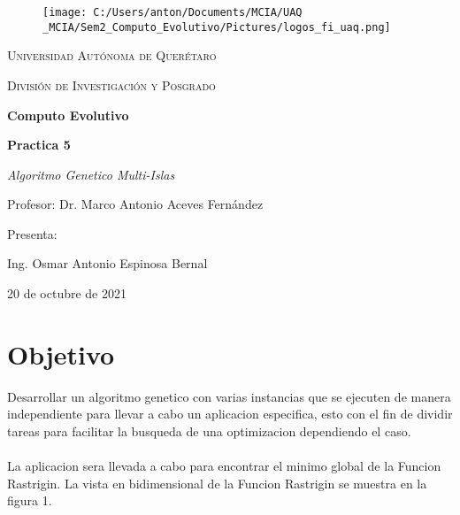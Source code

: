 \documentclass[10pt,letterpaper]{article}
\begin{document}
    \begin{titlepage}
     \centering
	   \begin{figure}
            \begin{minipage}{1\linewidth}
            \centering\centering%
            \texttt{[image: C:/Users/anton/Documents/MCIA/UAQ \_MCIA/Sem2\_Computo\_Evolutivo/Pictures/logos\_fi\_uaq.png]}
            \end{minipage}
        \end{figure}
        
        {\scshape\LARGE Universidad Autónoma de Querétaro \par}
	        \vspace{1cm}
	        
	    {\scshape\Large División de Investigación y Posgrado \par}
	        \vspace{1cm}
	        
		{\huge\bfseries Computo Evolutivo\par}
		    \vspace{1cm}
		    
		{\huge\bfseries Practica 5 \par}	
		    \vspace{1cm}
		    
		{\Large\itshape Algoritmo Genetico Multi-Islas\par}
		    \vspace{1cm}
		    
		Profesor: Dr. Marco Antonio Aceves Fernández \par
		\vspace{1.2cm}
		
		Presenta:\par  \vspace{0.15cm}
		
        Ing. Osmar Antonio Espinosa Bernal
        
		\vfill
		{\large  20 de octubre de 2021\par}
    \end{titlepage}
		\printindex
		
\section{Objetivo}
Desarrollar un algoritmo genetico con varias instancias que se ejecuten de manera independiente para llevar a cabo un aplicacion especifica, esto con el fin de dividir tareas para facilitar la busqueda de una optimizacion dependiendo el caso.
\\\\
La aplicacion sera llevada a cabo para encontrar el minimo global de la Funcion Rastrigin. La vista en bidimensional de la Funcion Rastrigin se muestra en la figura 1.
\end{document}
